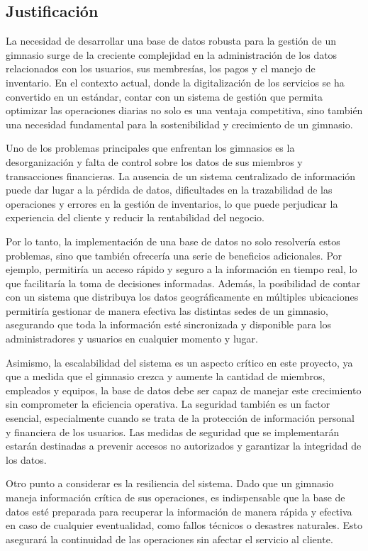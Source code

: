 \documentclass[spanish, 12pt]{article}
\begin{document}
	\subsection{Justificación}
	\label{justificaciuxf3n}

	La necesidad de desarrollar una base de datos robusta para la gestión de un gimnasio
	surge de la creciente complejidad en la administración de los datos relacionados
	con los usuarios, sus membresías, los pagos y el manejo de inventario. En el
	contexto actual, donde la digitalización de los servicios se ha convertido en un
	estándar, contar con un sistema de gestión que permita optimizar las
	operaciones diarias no solo es una ventaja competitiva, sino también una necesidad
	fundamental para la sostenibilidad y crecimiento de un gimnasio.

	Uno de los problemas principales que enfrentan los gimnasios es la desorganización
	y falta de control sobre los datos de sus miembros y transacciones financieras.
	La ausencia de un sistema centralizado de información puede dar lugar a la
	pérdida de datos, dificultades en la trazabilidad de las operaciones y errores
	en la gestión de inventarios, lo que puede perjudicar la experiencia del
	cliente y reducir la rentabilidad del negocio.

	Por lo tanto, la implementación de una base de datos no solo resolvería estos problemas,
	sino que también ofrecería una serie de beneficios adicionales. Por ejemplo,
	permitiría un acceso rápido y seguro a la información en tiempo real, lo que facilitaría
	la toma de decisiones informadas. Además, la posibilidad de contar con un sistema
	que distribuya los datos geográficamente en múltiples ubicaciones permitiría gestionar
	de manera efectiva las distintas sedes de un gimnasio, asegurando que toda la
	información esté sincronizada y disponible para los administradores y usuarios
	en cualquier momento y lugar.

	Asimismo, la escalabilidad del sistema es un aspecto crítico en este proyecto,
	ya que a medida que el gimnasio crezca y aumente la cantidad de miembros, empleados
	y equipos, la base de datos debe ser capaz de manejar este crecimiento sin
	comprometer la eficiencia operativa. La seguridad también es un factor esencial,
	especialmente cuando se trata de la protección de información personal y
	financiera de los usuarios. Las medidas de seguridad que se implementarán estarán
	destinadas a prevenir accesos no autorizados y garantizar la integridad de los
	datos.

	Otro punto a considerar es la resiliencia del sistema. Dado que un gimnasio
	maneja información crítica de sus operaciones, es indispensable que la base de
	datos esté preparada para recuperar la información de manera rápida y efectiva
	en caso de cualquier eventualidad, como fallos técnicos o desastres naturales.
	Esto asegurará la continuidad de las operaciones sin afectar el servicio al cliente.
\end{document}
